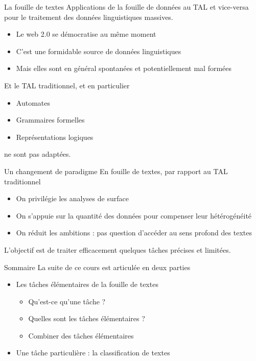 \documentclass[hyperref={unicode}, xcolor={svgnames}, french]{beamer}
\begin{document}
\begin{frame}{La fouille de textes}
    Applications de la fouille de données au TAL et vice-versa pour le traitement des données linguistiques massives.

    \begin{itemize}
        \item Le web 2.0 se démocratise au même moment
        \item C'est une formidable source de données linguistiques
        \item Mais elles sont en général spontanées et potentiellement mal formées
    \end{itemize}

    Et le TAL traditionnel, et en particulier
    \begin{itemize}
        \item Automates
        \item Grammaires formelles
        \item Représentations logiques
    \end{itemize}
    ne sont pas adaptées.
\end{frame}

\begin{frame}{Un changement de paradigme}
    En fouille de textes, par rapport au TAL traditionnel
    \begin{itemize}
        \item On privilégie les analyses de surface
        \item On s'appuie sur la quantité des données pour compenser leur hétérogénéité
        \item On réduit les ambitions : pas question d'accéder au sens profond des textes
    \end{itemize}

    L'objectif est de traiter efficacement quelques \alert{tâches} précises et limitées.
\end{frame}

\begin{frame}{Sommaire}
    La suite de ce cours est articulée en deux parties
    \begin{itemize}
        \item Les tâches élémentaires de la fouille de textes
         \begin{itemize}
             \item Qu'est-ce qu'une tâche ?
             \item Quelles sont les tâches élémentaires ?
             \item Combiner des tâches élémentaires
         \end{itemize}
        \item Une tâche particulière : la classification de textes
    \end{itemize}
\end{frame}
\end{document}
